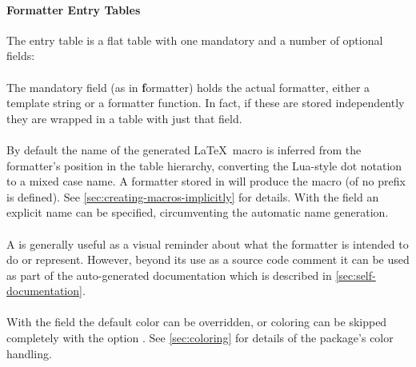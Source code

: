 \documentclass{scrartcl}
\begin{document}
\paragraph{Formatter Entry Tables}

The entry table is a flat table with one mandatory and a number of optional fields:

\paragraph{}

The mandatory field  (as in \textbf{f}ormatter) holds the actual
formatter, either a template string or a formatter function.  In fact, if these
are stored independently they are wrapped in a table with just that field.


\paragraph{}

By default the name of the generated \LaTeX\ macro is inferred from the
formatter's position in the table hierarchy, converting the Lua-style dot
notation to a mixed case name.  A formatter stored in 
will produce the macro  (of no prefix is defined).  See
\vref{sec:creating-macros-implicitly} for details.  With the 
field an explicit name can be specified, circumventing the automatic name
generation.


\paragraph{}

A  is generally useful as a visual reminder about what the
formatter is intended to do or represent.  However, beyond its use as a source
code comment it can be used as part of the auto-generated documentation which is
described in \vref{sec:self-documentation}.


\paragraph{}

With the  field the default color can be overridden, or coloring
can be skipped completely with the option .  See
\vref{sec:coloring} for details of the package's color handling.
\end{document}
